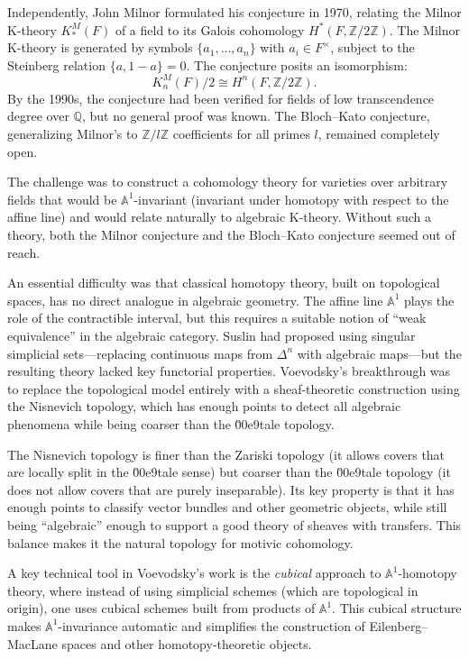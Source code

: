 Independently, John Milnor formulated his conjecture in 1970, relating the Milnor K-theory $K^M_*(F)$ of a field to its Galois cohomology $H^*(F, \mathbb{Z}/2\mathbb{Z})$. The Milnor K-theory is generated by symbols $\{a_1, \ldots, a_n\}$ with $a_i \in F^\times$, subject to the Steinberg relation $\{a, 1-a\} = 0$. The conjecture posits an isomorphism:
\[
K^M_n(F)/2 \cong H^n(F, \mathbb{Z}/2\mathbb{Z}).
\]
By the 1990s, the conjecture had been verified for fields of low transcendence degree over $\mathbb{Q}$, but no general proof was known. The Bloch--Kato conjecture, generalizing Milnor's to $\mathbb{Z}/l\mathbb{Z}$ coefficients for all primes $l$, remained completely open.

The challenge was to construct a cohomology theory for varieties over arbitrary fields that would be $\mathbb{A}^1$-invariant (invariant under homotopy with respect to the affine line) and would relate naturally to algebraic K-theory. Without such a theory, both the Milnor conjecture and the Bloch--Kato conjecture seemed out of reach.

An essential difficulty was that classical homotopy theory, built on topological spaces, has no direct analogue in algebraic geometry. The affine line $\mathbb{A}^1$ plays the role of the contractible interval, but this requires a suitable notion of ``weak equivalence'' in the algebraic category. Suslin had proposed using singular simplicial sets---replacing continuous maps from $\Delta^n$ with algebraic maps---but the resulting theory lacked key functorial properties. Voevodsky's breakthrough was to replace the topological model entirely with a sheaf-theoretic construction using the Nisnevich topology, which has enough points to detect all algebraic phenomena while being coarser than the \u00e9tale topology.

The Nisnevich topology is finer than the Zariski topology (it allows covers that are locally split in the \u00e9tale sense) but coarser than the \u00e9tale topology (it does not allow covers that are purely inseparable). Its key property is that it has enough points to classify vector bundles and other geometric objects, while still being ``algebraic'' enough to support a good theory of sheaves with transfers. This balance makes it the natural topology for motivic cohomology.

A key technical tool in Voevodsky's work is the \emph{cubical} approach to $\mathbb{A}^1$-homotopy theory, where instead of using simplicial schemes (which are topological in origin), one uses cubical schemes built from products of $\mathbb{A}^1$. This cubical structure makes $\mathbb{A}^1$-invariance automatic and simplifies the construction of Eilenberg--MacLane spaces and other homotopy-theoretic objects.

